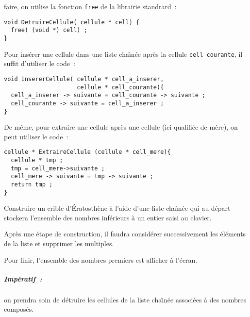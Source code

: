 faire, on   utilise  la   fonction  \texttt{free} de   la    librairie
standrard~:
\begin{verbatim}
void DetruireCellule( cellule * cell) {
  free( (void *) cell) ;
}
\end{verbatim}
Pour ins\'erer une cellule  dans  une liste cha\^\i{}n\'ee  apr\`es la
cellule \verb+cell_courante+, il suffit d'utiliser le code~:
\begin{verbatim}
void InsererCellule( cellule * cell_a_inserer, 
                     cellule * cell_courante){
  cell_a_inserer -> suivante = cell_courante -> suivante ;
  cell_courante -> suivante = cell_a_inserer ;
}
\end{verbatim}
De m\^eme,    pour  extraire une  cellule  apr\`es  une  cellule  (ici
qualifi\'ee de m\`ere), on peut utiliser le code~:
\begin{verbatim}
cellule * ExtraireCellule (cellule * cell_mere){
  cellule * tmp ;
  tmp = cell_mere->suivante ;
  cell_mere -> suivante = tmp -> suivante ;
  return tmp ;
}
\end{verbatim}
\begin{exercice}
  Construire un  crible   d'\'Eratosth\`ene  \`a l'aide   d'une  liste
  cha\^\i{}n\'ee  qui  au d\'epart   stockera  l'ensemble  des nombres
  inf\'erieurs \`a un entier saisi au clavier.
  \par
  Apr\`es une \'etape   de     construction, il   faudra     consid\'erer
  successivement  les \'el\'ements  de  la   liste  et supprimer   les
  multiples.
  \par
  Pour   finir, l'ensemble  des  nombres   premiers  est afficher  \`a
  l'\'ecran.
  \subparagraph{Imp\'eratif~:}  
  on  prendra  soin     de  d\'etruire les   cellules     de  la liste
  cha\^\i{}n\'ee associ\'ees \`a des nombres compos\'es.
  \ifcorrection%
  \begin{correction}
  \end{correction}
  \fi%
\end{exercice}
